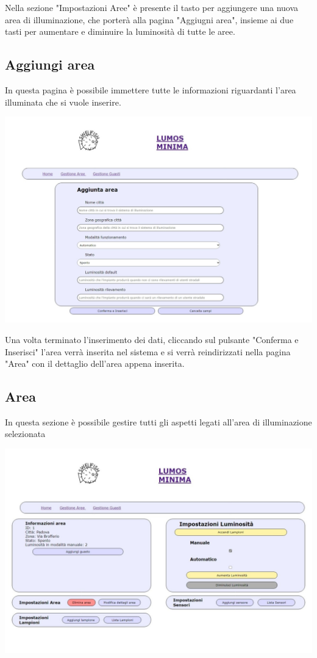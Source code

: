 \documentclass[9pt]{article}
\begin{document}
Nella sezione "Impostazioni Aree" è presente il tasto per aggiungere una nuova area di illuminazione, che porterà alla pagina "Aggiugni area", insieme ai due tasti per aumentare e diminuire la luminosità di tutte le aree.

\subsection{Aggiungi area}

In questa pagina è possibile immettere tutte le informazioni riguardanti l'area illuminata che si vuole inserire.

\begin{center}
	\includegraphics[scale=0.3]{Aggiungi_area.png}
\end{center}

Una volta terminato l'inserimento dei dati, cliccando sul pulsante "Conferma e Inserisci"
l'area verrà inserita nel sistema e si verrà reindirizzati nella pagina "Area" con il dettaglio dell'area appena inserita.

\subsection{Area}

In questa sezione è possibile gestire tutti gli aspetti legati all'area di illuminazione selezionata

\begin{center}
	\includegraphics[scale=0.3]{Area.png}
\end{center}
\end{document}
